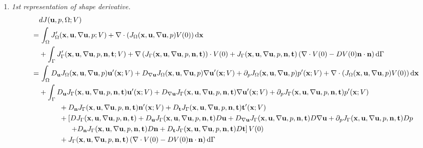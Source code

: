 \documentclass[oneside]{book}
\numberwithin{equation}{section}
\begin{document}
\begin{enumerate}[leftmargin=0in]
    \item \textit{1st representation of shape derivative.}
    \begin{align*}
        &dJ({\bf u},p,\Omega;V)\\
        =&\, \int_\Omega J_\Omega'({\bf x},{\bf u},\nabla{\bf u},p;V) + \nabla\cdot\left(J_\Omega({\bf x},{\bf u},\nabla{\bf u},p)V(0)\right){\rm d}{\bf x}\\
        &+ \int_\Gamma J_\Gamma'({\bf x},{\bf u},\nabla{\bf u},p,{\bf n},{\bf t};V) + \nabla\left(J_\Gamma({\bf x},{\bf u},\nabla{\bf u},p,{\bf n},{\bf t})\right)\cdot V(0) + J_\Gamma({\bf x},{\bf u},\nabla{\bf u},p,{\bf n},{\bf t})\left(\nabla\cdot V(0) - DV(0){\bf n}\cdot{\bf n}\right){\rm d}\Gamma\\
        =&\, \int_\Omega D_{\bf u}J_\Omega({\bf x},{\bf u},\nabla{\bf u},p){\bf u}'({\bf x};V) + D_{\nabla{\bf u}}J_\Omega({\bf x},{\bf u},\nabla{\bf u},p)\nabla{\bf u}'({\bf x};V) + \partial_pJ_\Omega({\bf x},{\bf u},\nabla{\bf u},p)p'({\bf x};V) + \nabla\cdot\left(J_\Omega({\bf x},{\bf u},\nabla{\bf u},p)V(0)\right){\rm d}{\bf x}\\
        &+ \int_\Gamma D_{\bf u}J_\Gamma({\bf x},{\bf u},\nabla{\bf u},p,{\bf n},{\bf t}){\bf u}'({\bf x};V) + D_{\nabla{\bf u}}J_\Gamma({\bf x},{\bf u},\nabla{\bf u},p,{\bf n},{\bf t})\nabla{\bf u}'({\bf x};V) + \partial_pJ_\Gamma({\bf x},{\bf u},\nabla{\bf u},p,{\bf n},{\bf t})p'({\bf x};V)\\
        &\hspace{1cm}+ D_{\bf n}J_\Gamma({\bf x},{\bf u},\nabla{\bf u},p,{\bf n},{\bf t}){\bf n}'({\bf x};V) + D_{\bf t}J_\Gamma({\bf x},{\bf u},\nabla{\bf u},p,{\bf n},{\bf t}){\bf t}'({\bf x};V)\\
        &\hspace{1cm}+ \left[DJ_\Gamma({\bf x},{\bf u},\nabla{\bf u},p,{\bf n},{\bf t}) + D_{\bf u}J_\Gamma({\bf x},{\bf u},\nabla{\bf u},p,{\bf n},{\bf t})D{\bf u} + D_{\nabla{\bf u}}J_\Gamma({\bf x},{\bf u},\nabla{\bf u},p,{\bf n},{\bf t})D\nabla{\bf u} + \partial_pJ_\Gamma({\bf x},{\bf u},\nabla{\bf u},p,{\bf n},{\bf t})Dp\right.\\
        &\hspace{15mm} \left.+ D_{\bf n}J_\Gamma({\bf x},{\bf u},\nabla{\bf u},p,{\bf n},{\bf t})D{\bf n} + D_{\bf t}J_\Gamma({\bf x},{\bf u},\nabla{\bf u},p,{\bf n},{\bf t})D{\bf t}\right]V(0)\\
        &\hspace{1cm}+ J_\Gamma({\bf x},{\bf u},\nabla{\bf u},p,{\bf n},{\bf t})\left(\nabla\cdot V(0) - DV(0){\bf n}\cdot{\bf n}\right){\rm d}\Gamma\\

\end{align*}
\end{enumerate}
\end{document}
